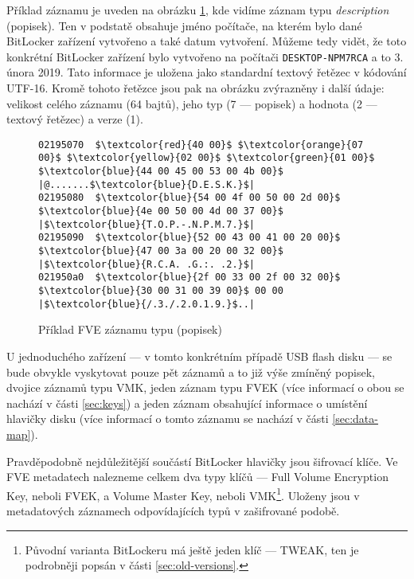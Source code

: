 
Příklad  záznamu je uveden na obrázku \ref{fig:fve-entry-desc}, kde vidíme záznam typu \emph{description} (popisek). Ten v podstatě obsahuje jméno počítače, na kterém bylo dané BitLocker zařízení vytvořeno a také datum vytvoření. Můžeme tedy vidět, že toto konkrétní BitLocker zařízení bylo vytvořeno na počítači \texttt{DESKTOP-NPM7RCA} a to 3. února 2019. Tato informace je uložena jako standardní textový řetězec v kódování UTF-16. Kromě tohoto řetězce jsou pak na obrázku zvýrazněny i další údaje: velikost celého záznamu (64 bajtů), jeho typ (7 --- popisek) a hodnota (2 --- textový řetězec) a verze (1).


\begin{figure}[h]
		\centering
		\captionsetup{width=0.65\linewidth}
\begin{lstlisting}[frame=none, escapechar=$, basicstyle=\ttfamily\small, columns=fullflexible, keepspaces=true]
02195070  $\textcolor{red}{40 00}$ $\textcolor{orange}{07 00}$ $\textcolor{yellow}{02 00}$ $\textcolor{green}{01 00}$  $\textcolor{blue}{44 00 45 00 53 00 4b 00}$ |@.......$\textcolor{blue}{D.E.S.K.}$|
02195080  $\textcolor{blue}{54 00 4f 00 50 00 2d 00}$  $\textcolor{blue}{4e 00 50 00 4d 00 37 00}$ |$\textcolor{blue}{T.O.P.-.N.P.M.7.}$|
02195090  $\textcolor{blue}{52 00 43 00 41 00 20 00}$  $\textcolor{blue}{47 00 3a 00 20 00 32 00}$ |$\textcolor{blue}{R.C.A. .G.:. .2.}$|
021950a0  $\textcolor{blue}{2f 00 33 00 2f 00 32 00}$  $\textcolor{blue}{30 00 31 00 39 00}$ 00 00 |$\textcolor{blue}{/.3./.2.0.1.9.}$..|
\end{lstlisting}
		\caption{Příklad FVE záznamu typu  (popisek)}
		\label{fig:fve-entry-desc}
\end{figure}

U jednoduchého zařízení --- v tomto konkrétním případě USB flash disku --- se bude obvykle vyskytovat pouze pět záznamů a to již výše zmíněný popisek, dvojice záznamů typu VMK, jeden záznam typu FVEK (více informací o obou se nachází v části \ref{sec:keys}) a jeden záznam obsahující informace o umístění hlavičky disku (více informací o tomto záznamu se nachází v části \ref{sec:data-map}).

\label{sec:keys}

Pravděpodobně nejdůležitější součástí BitLocker hlavičky jsou šifrovací klíče. Ve FVE metadatech nalezneme celkem dva typy klíčů --- Full Volume Encryption Key, neboli FVEK, a Volume Master Key, neboli VMK\footnote{Původní varianta BitLockeru má ještě jeden klíč --- TWEAK, ten je podrobněji popsán v části \ref{sec:old-versions}.}. Uloženy jsou v metadatových záznamech odpovídajících typů v zašifrované podobě.

